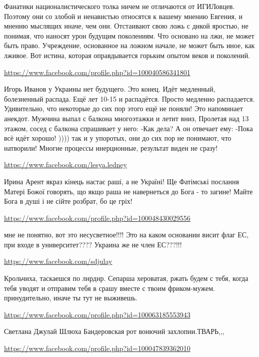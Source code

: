 \documentclass[a4paper,11pt]{extreport}
\begin{document}
\begin{itemize}
Фанатики националистического толка ничем не отличаются от ИГИЛовцев. Поэтому они со злобой и ненавистью относятся к вашему мнению Евгения, и мнению мыслящих иначе, чем они. Отстаивают свою ложь с дикой яростью, не понимая, что наносят урон будущим поколениям. Что основано на лжи, не может быть право. Учреждение, основанное на ложном начале, не может быть иное, как лживое. Вот истина, которая оправдывается горьким опытом веков и поколений.

\begin{itemize}
\url{https://www.facebook.com/profile.php?id=100040586341801}

Игорь Иванов у Украины нет будущего. Это конец. Идёт медленный, болезненный распада. Ещё лет 10-15 и распадётся. Просто медленно распадается. Удивительно, что некоторые до сих пор этого ещё не поняли! Это напоминает анекдот. Мужчина выпал с балкона многоэтажки и летит вниз, Пролетая над 13 этажом, сосед с балкона спрашивает у него: -Как дела? А он отвечает ему: -Пока всё идёт хорошо! )))) так и у упоротых, они до сих пор не понимают, что натворили! Многие процессы инерционные, результат виден не сразу!

\url{https://www.facebook.com/lesya.ledney}

Ирина Арент якраз кінець настає раші, а не Україні! Ще Фатімські послання Матері Божої говорять, що якщо раша не навернеться до Бога - то загине!
Майте Бога в душі і не сійте розбрат, бо це гріх!

\end{itemize}
\url{https://www.facebook.com/profile.php?id=100048430029556}

мне не понятно, вот это несусветное!!!! Это на каком основании висит флаг ЕС, при входе в университет???? Украина же не член ЕС???!!!

\url{https://www.facebook.com/sdjulay}

Крольчиха, таскаешся по лнрднр. Сепарша хероватая, ржать будем с тебя, когда тебя уводят и отправим тебя в срашу вместе с твоим фриком-мужем. принудительно, иначе ты тут не выживешь.

\begin{itemize}
\url{https://www.facebook.com/profile.php?id=100063185553943}

Светлана Джулай Шлюха Бандеровская рот вонючий захлопни.ТВАРЬ,,,

\end{itemize}
\url{https://www.facebook.com/profile.php?id=100047839362010}


\end{itemize}
\end{document}
